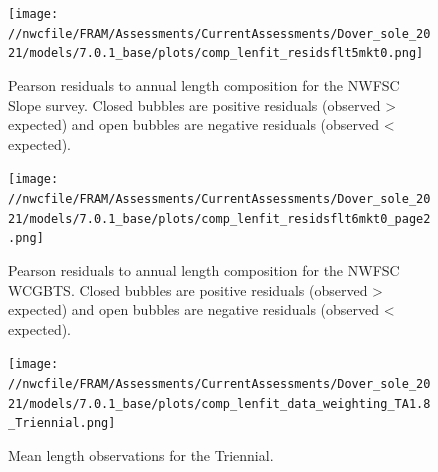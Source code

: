 \documentclass[11pt,
  english,
  a4paper,
]{article}
\begin{document}
\tagmcend\tagstructend


\begin{figure}
\centering
\texttt{[image: //nwcfile/FRAM/Assessments/CurrentAssessments/Dover\_sole\_2021/models/7.0.1\_base/plots/comp\_lenfit\_residsflt5mkt0.png]}
\caption{Pearson residuals to annual length composition for the NWFSC Slope survey. Closed bubbles are positive residuals (observed \textgreater{} expected) and open bubbles are negative residuals (observed \textless{} expected).\label{fig:nwslope-pearson}}
\end{figure}

\tagmcend\tagstructend


\begin{figure}
\centering
\texttt{[image: //nwcfile/FRAM/Assessments/CurrentAssessments/Dover\_sole\_2021/models/7.0.1\_base/plots/comp\_lenfit\_residsflt6mkt0\_page2.png]}
\caption{Pearson residuals to annual length composition for the NWFSC WCGBTS. Closed bubbles are positive residuals (observed \textgreater{} expected) and open bubbles are negative residuals (observed \textless{} expected).\label{fig:wcgbt-pearson}}
\end{figure}

\tagmcend\tagstructend


\begin{figure}
\centering
\texttt{[image: //nwcfile/FRAM/Assessments/CurrentAssessments/Dover\_sole\_2021/models/7.0.1\_base/plots/comp\_lenfit\_data\_weighting\_TA1.8\_Triennial.png]}
\caption{Mean length observations for the Triennial.\label{fig:tri-mean-len}}
\end{figure}

\tagmcend\tagstructend

\end{document}
